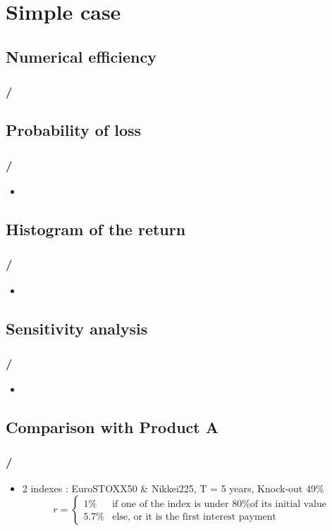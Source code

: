 \section{Simple case}

\subsection{Numerical efficiency}
\begin{frame}
\frametitle{\insertsection / \insertsubsection}
\begin{figure}
	\centering
\end{figure}
\end{frame}

\subsection{Probability of loss}
\begin{frame}
\frametitle{\insertsection / \insertsubsection}
\begin{itemize}
	\item []
\end{itemize}
\end{frame}

\subsection{Histogram of the return}
\begin{frame}
\frametitle{\insertsection / \insertsubsection}
\begin{itemize}
	\item []
\end{itemize}
\end{frame}

\subsection{Sensitivity analysis}
\begin{frame}
\frametitle{\insertsection / \insertsubsection}
\begin{itemize}
	\item []
\end{itemize}
\end{frame}

\subsection{Comparison with Product A}
\begin{frame}
\frametitle{\insertsection / \insertsubsection}
\begin{itemize}
	\item 2 indexes : EuroSTOXX50 \& Nikkei225, T = 5 years, Knock-out 49\% 
	$$
	r = 
	\left \{
	\begin{array}{ll}
    1\%   & \mbox{if one of the index is under 80\% of its initial value} \\
		5.7\% & \mbox{else, or it is the first interest payment}
  \end{array}
	\right.
	$$
\end{itemize}
\end{frame}